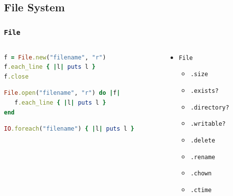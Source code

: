 \subsection{File System}
\begin{frame}[fragile]\frametitle{\texttt{File}}

\begin{columns}[c]

\begin{column}{7cm}

\begin{lstlisting}[language=ruby, escapechar={^}]
f = File.new("filename", "r")
f.each_line { |l| puts l }
f.close
\end{lstlisting}

\pause

\begin{lstlisting}[language=ruby, escapechar={^}]
File.open("filename", "r") do |f|
   f.each_line { |l| puts l }
end
\end{lstlisting}

\pause

\begin{lstlisting}[language=ruby, escapechar={^}]
IO.foreach("filename") { |l| puts l }
\end{lstlisting}

\end{column}

\pause

\begin{column}{4cm}
\begin{itemize}

\item \texttt{File}

\begin{itemize}
\item \texttt{.size}
\item \texttt{.exists?}
\item \texttt{.directory?}
\item \texttt{.writable?}
\item \texttt{.delete}
\item \texttt{.rename}
\item \texttt{.chown}
\item \texttt{.ctime}

\end{itemize}

\end{itemize}
\end{column}

\end{columns}

\end{frame}




